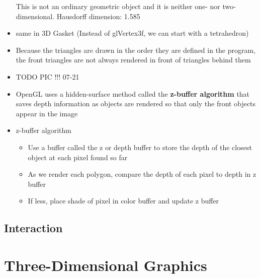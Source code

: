 \documentclass[11pt,a4paper]{article}
\begin{document}
\begin{itemize}
			This is not an ordinary geometric object and it is neither one- nor two-dimensional. Hausdorff dimension: 1.585	
			\item same in 3D Gasket (Instead of glVertex3f, we can start with a tetrahedron)
			\item Because the triangles are drawn in the order they are defined in the program, the front triangles are not always rendered in front of triangles behind them
			\item TODO PIC !!! 07-21
			\item OpenGL uses a hidden-surface method called the \textbf{z-buffer algorithm} that saves depth information as objects are rendered so that only the front objects appear in the image
			\item z-buffer algorithm
				\begin{itemize}
					\item Use a buffer called the z or depth buffer to store the depth of the closest object at each pixel found so far
					\item As we render each polygon, compare the depth of each pixel to depth in z buffer
					\item If less, place shade of pixel in color buffer and update z buffer
				\end{itemize}
			

		\end{itemize}
	\subsection{Interaction}
		
\section{Three-Dimensional Graphics}
\end{document}
